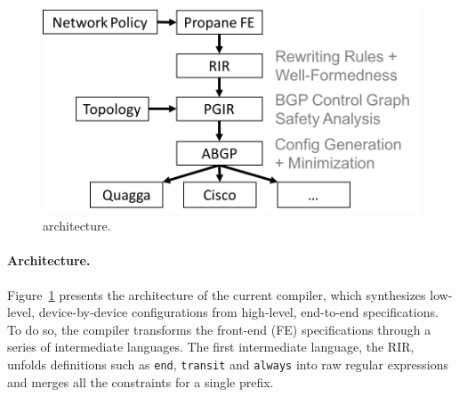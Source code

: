 %
\begin{figure}
  \centering
  \includegraphics[width=.45\textwidth]{figures/pipeline}
%
\caption{\Propane architecture.
}
  \label{fig:pipeline}
  \vspace{-1em}
\end{figure}
%
\paragraph*{Architecture.}
Figure~\ref{fig:pipeline} presents the architecture of the
current \Propane compiler, which synthesizes low-level, device-by-device configurations
from high-level, end-to-end specifications.  
To do so, the compiler transforms the front-end (FE) specifications through
a series of intermediate languages.  The first intermediate language, the
RIR, unfolds definitions such as \texttt{end}, \texttt{transit} and \texttt{always} into raw regular expressions and merges all the constraints for a single
prefix.  

